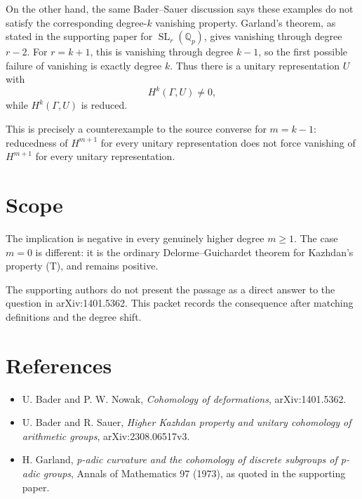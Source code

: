 \documentclass[11pt]{article}
\newcommand{\GammaG}{\Gamma}
\newcommand{\SL}{\operatorname{SL}}
\newcommand{\QQ}{\mathbb Q}
\begin{document}
On the other hand, the same Bader--Sauer discussion says these examples do not
satisfy the corresponding degree-\(k\) vanishing property.  Garland's theorem,
as stated in the supporting paper for \(\SL_r(\QQ_p)\), gives vanishing through
degree \(r-2\).  For \(r=k+1\), this is vanishing through degree \(k-1\), so the
first possible failure of vanishing is exactly degree \(k\).  Thus there is a
unitary representation \(U\) with
\[
  H^k(\GammaG,U)\neq 0,
\]
while \(H^k(\GammaG,U)\) is reduced.

This is precisely a counterexample to the source converse for \(m=k-1\):
reducedness of \(H^{m+1}\) for every unitary representation does not force
vanishing of \(H^{m+1}\) for every unitary representation.

\section{Scope}

The implication is negative in every genuinely higher degree \(m\geq 1\).  The
case \(m=0\) is different: it is the ordinary Delorme--Guichardet theorem for
Kazhdan's property (T), and remains positive.

The supporting authors do not present the passage as a direct answer to the
question in arXiv:1401.5362.  This packet records the consequence after matching
definitions and the degree shift.

\section{References}

\begin{itemize}[leftmargin=*]
\item U. Bader and P. W. Nowak, \emph{Cohomology of deformations},
arXiv:1401.5362.
\item U. Bader and R. Sauer, \emph{Higher Kazhdan property and unitary
cohomology of arithmetic groups}, arXiv:2308.06517v3.
\item H. Garland, \emph{p-adic curvature and the cohomology of discrete
subgroups of p-adic groups}, Annals of Mathematics 97 (1973), as quoted in the
supporting paper.
\end{itemize}
\end{document}
